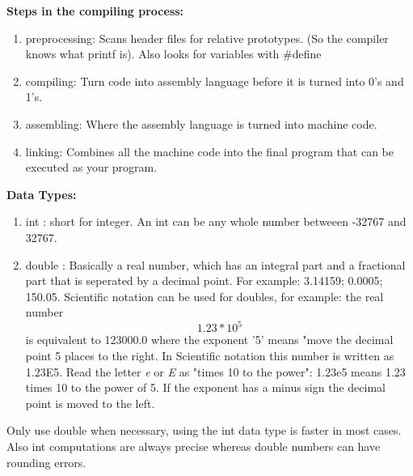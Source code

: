 \documentclass[12pt, letterpaper]{report}
\begin{document}
\textbf{Steps in the compiling process:}

\begin{enumerate}
	\item preprocessing: Scans header files for relative prototypes. (So the compiler knows what printf is). Also looks for variables with \#define
	\item compiling: Turn code into assembly language before it is turned into 0's and 1's.
	\item assembling: Where the assembly language is turned into machine code.
	\item linking: Combines all the machine code into the final program that can be executed as your program.
\end{enumerate}

\textbf{Data Types:}
\begin{enumerate}
	\item int : short for integer. An int can be any whole number betweeen 
		-32767 and 32767.
	\item double : Basically a real number, which has an integral part and a 
		fractional part that is seperated by a decimal point. For example: 
		3.14159; 0.0005; 150.05. Scientific notation can be used for doubles,
		for example: the real number \[ 1.23 * 10^5 \] is equivalent to 123000.0
		where the exponent '5' means "move the decimal point 5 places to the right.
		In Scientific notation this number is written as 1.23E5. Read the letter 
		\textit{e} or \textit{E} as "times 10 to the power": 1.23e5 means 1.23 times
		10 to the power of 5. If the exponent has a minus sign the decimal point is
		moved to the left.
\end{enumerate}
Only use double when necessary, using the int data type is faster in most cases. Also
int computations are always precise whereas double numbers can have rounding 
errors.
\end{document}
